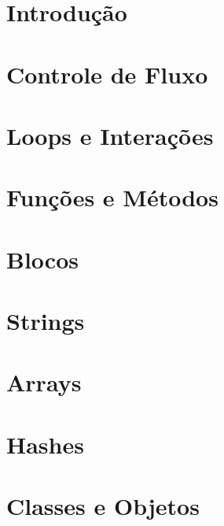 \documentclass[t, 				             
			   final,
			   12pt, 				         
			   xcolor={usenames,dvipsnames}, 
			   table]{beamer}
\begin{document}
	
	
	  
%	
%	
%	
%	
	
	\section{Introdução}	
	
	\section{Controle de Fluxo}
	
	\section{Loops e Interações}	
	
	\section{Funções e Métodos}
	
	\section{Blocos}	
	
	\section{Strings}	
	
	\section{Arrays}	
	
	\section{Hashes}	
	
	\section{Classes e Objetos}	
	
\end{document}
